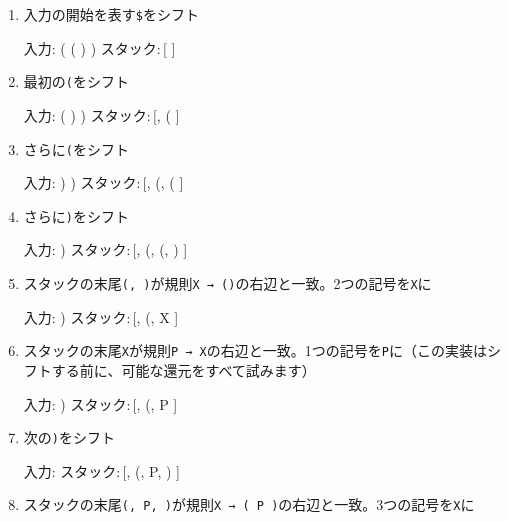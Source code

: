 \begin{enumerate}
\item
  入力の開始を表す\texttt{\$}をシフト

\begin{codescreen}{}
入力: ( ( ) ) $
スタック: [ $ ]
\end{codescreen}

\item
  最初の\texttt{(}をシフト

\begin{codescreen}{}
入力: ( ) ) $
スタック: [ $, ( ]
\end{codescreen}

\item
  さらに\texttt{(}をシフト

\begin{codescreen}{}
入力: ) ) $
スタック: [ $, (, ( ]
\end{codescreen}

\item
  さらに\texttt{)}をシフト

\begin{codescreen}{}
入力: ) $
スタック: [ $, (, (, ) ]
\end{codescreen}

\item
  スタックの末尾\texttt{(,\ )}が規則\texttt{X\ →\ ()}の右辺と一致。2つの記号を\texttt{X}に

\begin{codescreen}{}
入力: ) $
スタック: [ $, (, X ]
\end{codescreen}

\item
  スタックの末尾\texttt{X}が規則\texttt{P\ →\ X}の右辺と一致。1つの記号を\texttt{P}に（この実装はシフトする前に、可能な還元をすべて試みます）

\begin{codescreen}{}
入力: ) $
スタック: [ $, (, P ]
\end{codescreen}

\item
  次の\texttt{)}をシフト

\begin{codescreen}{}
入力: $
スタック: [ $, (, P, ) ]
\end{codescreen}

\item
  スタックの末尾\texttt{(,\ P,\ )}が規則\texttt{X\ →\ (\ P\ )}の右辺と一致。3つの記号を\texttt{X}に


\end{enumerate}
